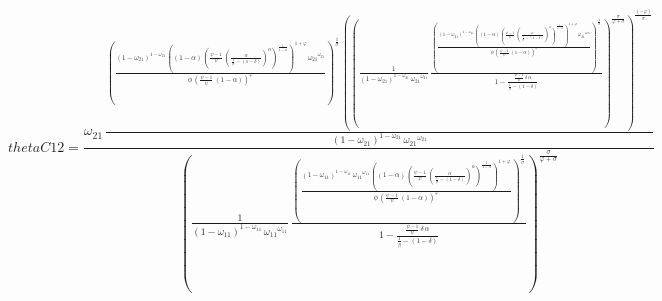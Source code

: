 \begin{dmath*}
thetaC12 = \frac{{{\omega_{21}}}\, \frac{\left(\frac{\left(1-{{\omega_{21}}}\right)^{1-{{\omega_{21}}}}\, \left(\left(1-{{\alpha}}\right)\, \left(\frac{{{\psi}}-1}{{{\psi}}}\, \left(\frac{{{\alpha}}}{\frac{1}{{{\beta}}}-\left(1-{{\delta}}\right)}\right)^{{{\alpha}}}\right)^{\frac{1}{1-{{\alpha}}}}\right)^{1+{{\varphi}}}\, {{\omega_{21}}}^{{{\omega_{21}}}}}{{{\phi}}\, \left(\frac{{{\psi}}-1}{{{\psi}}}\, \left(1-{{\alpha}}\right)\right)^{{{\varphi}}}}\right)^{\frac{1}{{{\sigma}}}}\, \left(\left(\frac{1}{\left(1-{{\omega_{21}}}\right)^{1-{{\omega_{21}}}}\, {{\omega_{21}}}^{{{\omega_{21}}}}}\, \frac{\left(\frac{\left(1-{{\omega_{21}}}\right)^{1-{{\omega_{21}}}}\, \left(\left(1-{{\alpha}}\right)\, \left(\frac{{{\psi}}-1}{{{\psi}}}\, \left(\frac{{{\alpha}}}{\frac{1}{{{\beta}}}-\left(1-{{\delta}}\right)}\right)^{{{\alpha}}}\right)^{\frac{1}{1-{{\alpha}}}}\right)^{1+{{\varphi}}}\, {{\omega_{21}}}^{{{\omega_{21}}}}}{{{\phi}}\, \left(\frac{{{\psi}}-1}{{{\psi}}}\, \left(1-{{\alpha}}\right)\right)^{{{\varphi}}}}\right)^{\frac{1}{{{\sigma}}}}}{1-\frac{\frac{{{\psi}}-1}{{{\psi}}}\, {{\delta}}\, {{\alpha}}}{\frac{1}{{{\beta}}}-\left(1-{{\delta}}\right)}}\right)^{\frac{{{\sigma}}}{{{\varphi}}+{{\sigma}}}}\right)^{\frac{\left(-{{\varphi}}\right)}{{{\sigma}}}}}{\left(1-{{\omega_{21}}}\right)^{1-{{\omega_{21}}}}\, {{\omega_{21}}}^{{{\omega_{21}}}}}}{\left(\frac{1}{\left(1-{{\omega_{11}}}\right)^{1-{{\omega_{11}}}}\, {{\omega_{11}}}^{{{\omega_{11}}}}}\, \frac{\left(\frac{\left(1-{{\omega_{11}}}\right)^{1-{{\omega_{11}}}}\, {{\omega_{11}}}^{{{\omega_{11}}}}\, \left(\left(1-{{\alpha}}\right)\, \left(\frac{{{\psi}}-1}{{{\psi}}}\, \left(\frac{{{\alpha}}}{\frac{1}{{{\beta}}}-\left(1-{{\delta}}\right)}\right)^{{{\alpha}}}\right)^{\frac{1}{1-{{\alpha}}}}\right)^{1+{{\varphi}}}}{{{\phi}}\, \left(\frac{{{\psi}}-1}{{{\psi}}}\, \left(1-{{\alpha}}\right)\right)^{{{\varphi}}}}\right)^{\frac{1}{{{\sigma}}}}}{1-\frac{\frac{{{\psi}}-1}{{{\psi}}}\, {{\delta}}\, {{\alpha}}}{\frac{1}{{{\beta}}}-\left(1-{{\delta}}\right)}}\right)^{\frac{{{\sigma}}}{{{\varphi}}+{{\sigma}}}}}
\end{dmath*}
